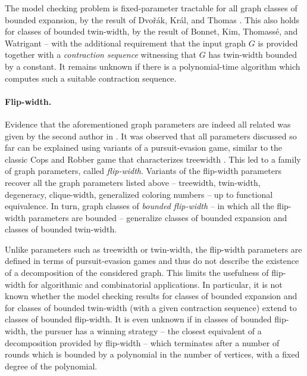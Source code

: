 \documentclass[11pt]{article}
\newcommand{\sz}[1]{\todo[color=pink!40]{sz: #1}}
\newcommand{\jan}[1]{\todo[color=green!40]{jan: #1}}
\theoremstyle{remark}
\def\Dvorak{Dvo\v{r}\'{a}k\xspace}
\def\Kral{Kr\'{a}l\xspace}
\newcommand{\anonym}[2][]{#2}%
\begin{document}
The model checking problem is fixed-parameter tractable for all graph classes of bounded expansion, by the result of \Dvorak, \Kral, and Thomas \cite{DvorakKT13-journal}.
This also holds for classes of bounded twin-width, by the result of Bonnet, Kim, Thomass\'e, and Watrigant \cite{tww1} -- with the additional requirement that the input graph $G$ is provided together with
a \emph{contraction sequence} witnessing that $G$ has twin-width bounded by a constant.
It remains unknown if there is a polynomial-time algorithm which
computes such a suitable contraction sequence.


\medskip
\paragraph{Flip-width.}
Evidence that the aforementioned graph parameters are
indeed all related
was given by \anonym[Toruńczyk]{the second author} in \cite{flip-width}. It was observed that all parameters discussed so far
can be explained using variants of a pursuit-evasion game, similar to the classic Cops and Robber game that characterizes treewidth \cite{seymour-thomas-cops}.
This led to a
family of graph parameters, called \emph{flip-width}.
Variants of the flip-width parameters recover
 all the graph parameters listed above -- treewidth, twin-width, degeneracy, clique-width, generalized coloring numbers -- up to functional equivalence.
In turn, graph classes of \emph{bounded flip-width} -- in which all the flip-width parameters are bounded --
generalize classes of bounded expansion and classes of bounded twin-width.

Unlike parameters such as treewidth or twin-width,
the flip-width parameters are defined in terms of pursuit-evasion games
and thus do not describe
the existence of a decomposition of the considered graph.
This limits the usefulness of flip-width for algorithmic and combinatorial applications.
In particular, it is not known whether the model checking results
for classes of bounded expansion and for classes of bounded twin-width (with a given contraction sequence) extend
to classes of bounded flip-width.
It is even unknown if in classes of bounded flip-width, the pursuer has a winning strategy
-- the closest equivalent of a decomposition provided by flip-width --
which terminates after a number of rounds which is bounded by a polynomial in the number of vertices, with a fixed degree of the polynomial.
\end{document}
